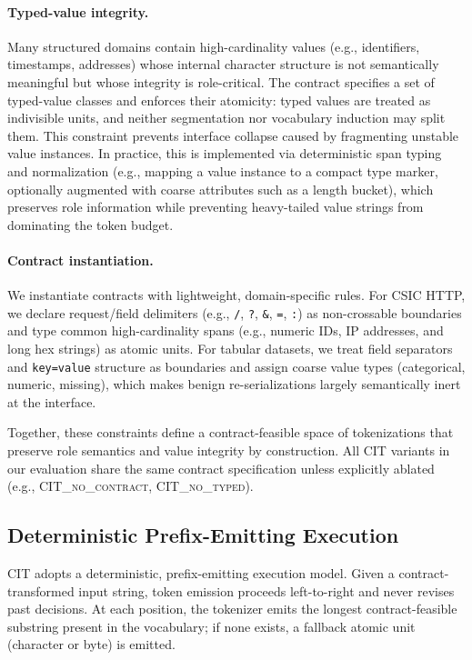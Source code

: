 \paragraph{Typed-value integrity.}
Many structured domains contain high-cardinality values (e.g., identifiers, timestamps, addresses) whose internal character structure is not semantically meaningful but whose integrity is role-critical.
The contract specifies a set of typed-value classes and enforces their atomicity: typed values are treated as indivisible units, and neither segmentation nor vocabulary induction may split them.
This constraint prevents interface collapse caused by fragmenting unstable value instances.
In practice, this is implemented via deterministic span typing and normalization (e.g., mapping a value instance to a compact type marker, optionally augmented with coarse attributes such as a length bucket), which preserves role information while preventing heavy-tailed value strings from dominating the token budget.

\paragraph{Contract instantiation.}
We instantiate contracts with lightweight, domain-specific rules.
For CSIC HTTP, we declare request/field delimiters (e.g., \texttt{/}, \texttt{?}, \texttt{\&}, \texttt{=}, \texttt{:}) as non-crossable boundaries and type common high-cardinality spans (e.g., numeric IDs, IP addresses, and long hex strings) as atomic units.
For tabular datasets, we treat field separators and \texttt{key=value} structure as boundaries and assign coarse value types (categorical, numeric, missing), which makes benign re-serializations largely semantically inert at the interface.

Together, these constraints define a contract-feasible space of tokenizations that preserve role semantics and value integrity by construction.
All CIT variants in our evaluation share the same contract specification unless explicitly ablated (e.g., \textsc{CIT\_no\_contract}, \textsc{CIT\_no\_typed}).

\subsection{Deterministic Prefix-Emitting Execution}
\label{sec:execution}

CIT adopts a deterministic, prefix-emitting execution model.
Given a contract-transformed input string, token emission proceeds left-to-right and never revises past decisions.
At each position, the tokenizer emits the longest contract-feasible substring present in the vocabulary; if none exists, a fallback atomic unit (character or byte) is emitted.

